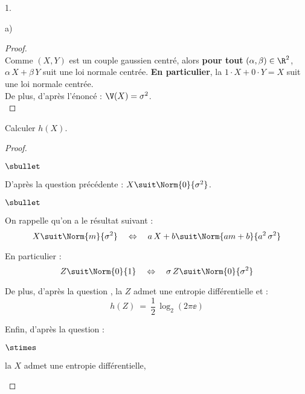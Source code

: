 \documentclass[11pt]{article}%
\begin{document}
\begin{noliste}{1.}
\begin{noliste}{a)}
    \begin{proof}~\\
      Comme $(X,Y)$ est un couple gaussien centré, alors {\bf pour tout}
      $(\alpha, \beta) \in \R^2$, $\alpha \, X + \beta \, Y$ suit une
      loi normale centrée. {\bf En particulier}, la \var $1 \cdot X + 0 \cdot
      Y=X$ suit une loi normale centrée.\\
      De plus, d'après l'énoncé : $\V(X) = \sigma^2$.
      ~\\[-1cm]
    \end{proof}
    
  \item Calculer $h(X)$.

    \begin{proof}~
      \begin{noliste}{$\sbullet$}
      \item D'après la question précédente : $X \suit \Norm{0}{\sigma^2}$.

        \begin{remark}
          \begin{noliste}{$\sbullet$}
          \item On rappelle qu'on a le résultat suivant :
            \[
              X \suit \Norm{m}{\sigma^2} \quad \Leftrightarrow \quad a
              \, X + b \suit \Norm{am +b}{a^2 \, \sigma^2}
            \]
            
          \item En particulier :
            \[
              Z \suit \Norm{0}{1} \quad \Leftrightarrow \quad \sigma
              \, Z \suit \Norm{0}{\sigma^2}
            \]
          \end{noliste}
        \end{remark}
        
      \item De plus, d'après la question , la \var $Z$
        admet une entropie différentielle et :
        \[
          h(Z) \ = \ \dfrac{1}{2} \, \log_2(2 \pi \ee)
        \]
        
      \item Enfin, d'après la question  :
        \begin{noliste}{$\stimes$}
        \item la \var $X$ admet une entropie différentielle,
          

\end{noliste}
\end{noliste}
\end{proof}
\end{noliste}
\end{noliste}
\end{document}
